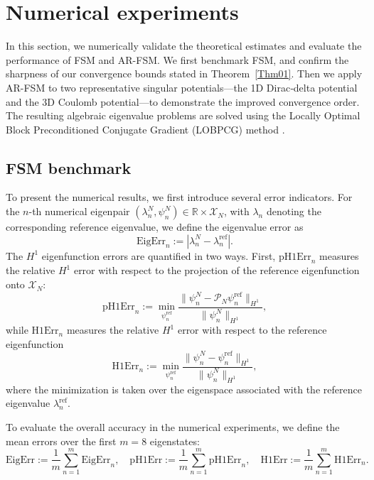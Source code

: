 \documentclass{sn-jnl}%
\numberwithin{equation}{section}
\theoremstyle{thmstyleone}%
\theoremstyle{thmstyletwo}%
\theoremstyle{thmstylethree}%
\begin{document}
\section{Numerical experiments}
\label{sec:experiments}
In this section, we numerically validate the theoretical estimates and evaluate the performance of FSM and AR-FSM. We first benchmark FSM, and confirm the sharpness of our convergence bounds stated in Theorem~\ref{Thm01}. Then we apply AR-FSM to two representative singular potentials—the 1D Dirac‑delta potential and the 3D Coulomb potential—to demonstrate the improved convergence order.
The resulting algebraic eigenvalue problems are solved using the Locally Optimal Block Preconditioned Conjugate Gradient (LOBPCG) method \cite{knyazev2001LOBPCG}.


\subsection{FSM benchmark}
To present the numerical results, we first introduce several error indicators.
For the $n$-th numerical eigenpair $(\lambda_n^N, \psi_n^N) \in \mathbb{R} \times \mathscr{X}_N$, with $\lambda_n$ denoting the corresponding reference eigenvalue, we define the eigenvalue error as
\begin{equation}
\mathrm{EigErr}_n := |\lambda_n^N - \lambda_n^{\mathrm{ref}}|.
\end{equation}
The $H^1$ eigenfunction errors are quantified in two ways. First, $\mathrm{pH1Err}_n$ measures the relative $H^1$ error with respect to the projection of the reference eigenfunction onto $\mathscr{X}_N$:
\begin{equation}\label{eq:pH1Err}
\mathrm{pH1Err}_n := \min_{\psi^{\mathrm{ref}}_n} 
\frac{\|\psi_n^N - \mathcal{P}_N \psi^{\mathrm{ref}}_n\|_{H^1}}{\|\psi_n^N\|_{H^1}},
\end{equation}
while $\mathrm{H1Err}_n$ measures the relative $H^1$ error with respect to the reference eigenfunction
\begin{equation}
\mathrm{H1Err}_n := \min_{\psi_n^{\mathrm{ref}} } 
\frac{\|\psi_n^N - \psi_n^{\mathrm{ref}}\|_{H^1}}{\|\psi_n^N\|_{H^1}},
\end{equation}
where the minimization is taken over the eigenspace associated with the reference eigenvalue $\lambda_n^{\mathrm{ref}}$.

To evaluate the overall accuracy in the numerical experiments, we define the mean errors over the first $m=8$ eigenstates:
\[
\mathrm{EigErr} := \frac{1}{m}\sum_{n=1}^{m} \mathrm{EigErr}_n, \quad
\mathrm{pH1Err} := \frac{1}{m}\sum_{n=1}^{m} \mathrm{pH1Err}_n, \quad
\mathrm{H1Err} := \frac{1}{m}\sum_{n=1}^{m} \mathrm{H1Err}_n.
\]
\end{document}
